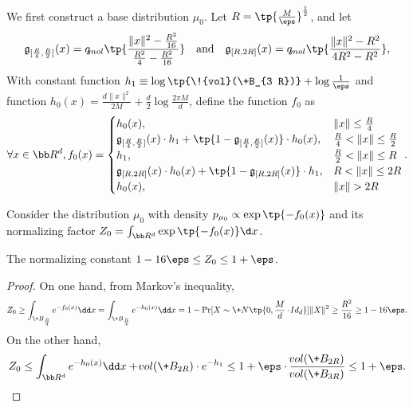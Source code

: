 We first construct a base distribution $\mu_0$. Let $R= \tp{\frac{M}{\eps}}^{\frac{1}{2}}$, and let
\[
    \mathfrak{g}_{[\frac{R}{4},\frac{R}{2}]}(x)=q_{\!{mol}}\tp{\frac{ \|x\|^2- \frac{R^2}{16}}{\frac{R^2}{4} - \frac{R^2}{16}}} \quad \mbox{and} \quad \mathfrak{g}_{[R,2R]}(x)=q_{\!{mol}}\tp{\frac{\|x\|^2-R^2}{4R^2-R^2}},
\]
With constant function $h_1 \equiv \log \tp{\!{vol}(\+B_{3 R})} + \log \frac{1}{\eps}$ and function $h_0(x)=\frac{d\|x\|^2}{2M} + \frac{d}{2}\log \frac{2\pi M}{d}$, define the function $f_0$ as
\[
    \forall x\in \bb R^d, f_0(x) = \begin{cases} h_0(x), & \|x\|\leq \frac{R}{4} \\
    \mathfrak{g}_{[\frac{R}{4},\frac{R}{2}]}(x)\cdot h_1 + \tp{1-\mathfrak{g}_{[\frac{R}{4},\frac{R}{2}]}(x)}\cdot h_0(x), & \frac{R}{4}<\|x\| \leq \frac{R}{2}\\
    h_1, & \frac{R}{2} <\|x\|\leq R\\
    \mathfrak{g}_{[R,2R]}(x)\cdot h_0(x) + \tp{1-\mathfrak{g}_{[R,2R]}(x)}\cdot h_1, & R<\|x\|\leq 2R \\
    h_0(x), & \|x\|>2R
    \end{cases}.
\]

Consider the distribution $\mu_0$ with density $p_{\mu_0} \propto \exp\tp{-f_0(x)}$ and its normalizing factor $Z_0 = \int_{\bb R^d} \exp\tp{-f_0(x)} \d x$.
\begin{lemma}\label{lem:Z_0}
    The normalizing constant $1-16\eps \leq Z_0 \leq  1+\eps$. 
\end{lemma}
\begin{proof}
    On one hand, from Markov's inequality,
    $$
        Z_0\geq \int_{\+B_{\frac{R}{4}}} e^{-f_0(x)} \dd x = \int_{\+B_{\frac{R}{4}}} e^{-h_0(x)} \dd x = 1- \Pr[X\sim \+N\tp{0,\frac{M}{d}\cdot \!{Id}_d}]{\|X\|^2\geq \frac{R^2}{16}} \geq 1-16\eps.
    $$
    On the other hand, 
    $$
        Z_0\leq \int_{\bb R^d} e^{-h_0(x)} \dd x + \vol (\+B_{2R})\cdot e^{-h_1} \leq 1 + \eps\cdot \frac{\vol (\+B_{2R})}{\vol(\+B_{3R})}\leq 1+\eps.
    $$
    
    
\end{proof}

